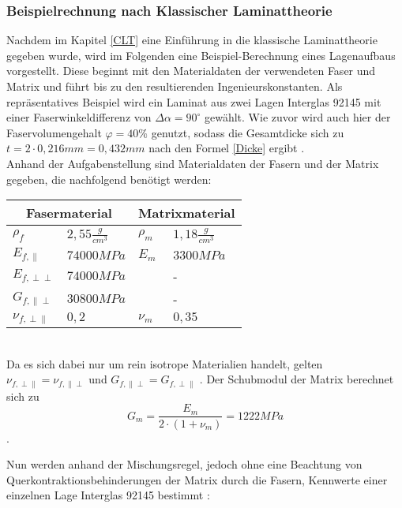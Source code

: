 \subsubsection{Beispielrechnung nach Klassischer Laminattheorie}
Nachdem im Kapitel \ref{CLT} eine Einführung in die klassische Laminattheorie gegeben wurde, wird im Folgenden eine Beispiel-Berechnung eines Lagenaufbaus vorgestellt. Diese beginnt mit den Materialdaten der verwendeten Faser und Matrix und führt bis zu den resultierenden Ingenieurskonstanten. Als repräsentatives Beispiel wird ein Laminat aus zwei Lagen Interglas 92145 mit einer Faserwinkeldifferenz von $\Delta\alpha =90^{\circ}$ gewählt. Wie zuvor wird auch hier der Faservolumengehalt $\varphi = 40\%$ genutzt, sodass die Gesamtdicke sich zu $t= 2\cdot 0,216mm=0,432mm$ nach den Formel \ref{Dicke} ergibt \cite{item5}\cite{item3}. \\

\noindent Anhand der Aufgabenstellung sind Materialdaten der Fasern und der Matrix gegeben, die nachfolgend benötigt werden:\\

\begin{tabular}{ll|ll}
	\multicolumn{2}{c}{Fasermaterial} &\multicolumn{2}{c}{Matrixmaterial}\\
	\hline\hline
	$\rho_{f}$ & $2,55 \frac{g}{cm^{3}}$  & $\rho_{m}$ & $1,18 \frac{g}{cm^{3}}$\\
	\hline
	$E_{f,\parallel}$ & $74000MPa$  & $E_{m}$ & $3300MPa$\\
	\hline
	$E_{f,\perp\perp}$ & $74000MPa$  &  & - \\
	\hline
	$G_{f,\parallel\perp}$ & $30800MPa$ &  & - \\
	\hline
	$\nu_{f,\perp\parallel}$ & $0,2$  &$\nu_{m}$ &  $0,35$\\
\end{tabular}\\

\noindent Da es sich dabei nur um rein isotrope Materialien handelt, gelten $\nu_{f,\perp\parallel} = \nu_{f,\parallel\perp}$ und $G_{f,\parallel\perp} = G_{f,\perp\parallel}$ \cite{item15}. Der Schubmodul der Matrix berechnet sich zu
\begin{equation}
 	G_{m}=\frac{E_{m}}{2\cdot (1+\nu_{m})}=1222MPa
\end{equation}.

\noindent Nun werden anhand der Mischungsregel, jedoch ohne eine Beachtung von Querkontraktionsbehinderungen der Matrix durch die Fasern, Kennwerte einer einzelnen Lage Interglas 92145 bestimmt \cite{item3}:

